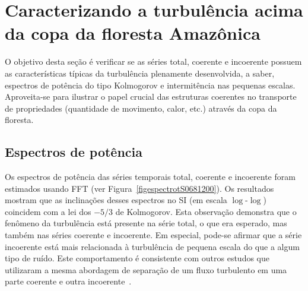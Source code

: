\section{Caracterizando a turbulência acima da copa da floresta Amazônica}

O objetivo desta seção é verificar se as séries total, coerente e incoerente possuem as características típicas da turbulência plenamente desenvolvida, a saber, espectros de potência do tipo Kolmogorov e intermitência nas pequenas escalas. Aproveita-se para ilustrar o papel crucial das estruturas coerentes no transporte de propriedades (quantidade de movimento, calor, etc.) através da copa da floresta.

\subsection{Espectros de potência}

Os espectros de potência das séries temporais total, coerente e incoerente foram estimados usando FFT (ver Figura~\ref{figespectrotS0681200}). Os resultados mostram que as inclinações desses espectros no SI (em escala $\log$-$\log$) coincidem com a lei dos $-5/3$ de Kolmogorov. Esta observação demonstra que o fenômeno da turbulência está presente na série total, o que era esperado, mas também nas séries coerente e incoerente. Em especial, pode-se afirmar que a série incoerente está mais relacionada à turbulência de pequena escala do que a algum tipo de ruído. Este comportamento é consistente com outros estudos que utilizaram a mesma abordagem de separação de um fluxo turbulento em uma parte coerente e outra incoerente~\cite{farge/01}.

